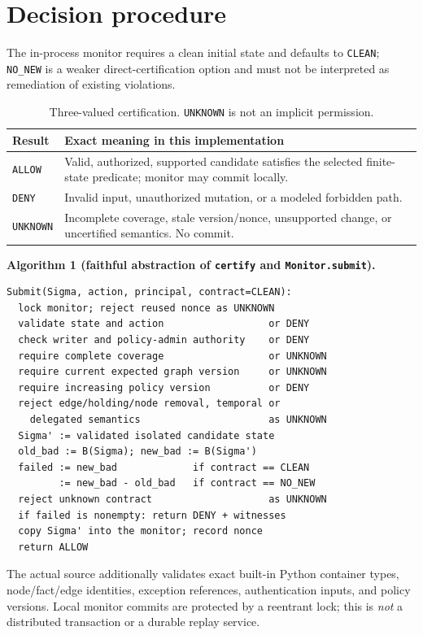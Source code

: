 \documentclass[11pt,letterpaper]{article}
\begin{document}
\section{Decision procedure}
The in-process monitor requires a clean initial state and defaults to \texttt{CLEAN}; \texttt{NO\_NEW} is a weaker direct-certification option and must not be interpreted as remediation of existing violations.
\begin{table}[H]
\centering\small
\begin{tabularx}{\linewidth}{@{}lX@{}}\toprule
Result & Exact meaning in this implementation\\\midrule
\texttt{ALLOW} & Valid, authorized, supported candidate satisfies the selected finite-state predicate; monitor may commit locally.\\
\texttt{DENY} & Invalid input, unauthorized mutation, or a modeled forbidden path.\\
\texttt{UNKNOWN} & Incomplete coverage, stale version/nonce, unsupported change, or uncertified semantics. No commit.\\\bottomrule
\end{tabularx}
\caption{Three-valued certification. \texttt{UNKNOWN} is not an implicit permission.}
\end{table}
\noindent\textbf{Algorithm 1 (faithful abstraction of \texttt{certify} and \texttt{Monitor.submit}).}
\begin{lstlisting}[language={},basicstyle=\ttfamily\small]
Submit(Sigma, action, principal, contract=CLEAN):
  lock monitor; reject reused nonce as UNKNOWN
  validate state and action                  or DENY
  check writer and policy-admin authority    or DENY
  require complete coverage                  or UNKNOWN
  require current expected graph version     or UNKNOWN
  require increasing policy version          or DENY
  reject edge/holding/node removal, temporal or
    delegated semantics                      as UNKNOWN
  Sigma' := validated isolated candidate state
  old_bad := B(Sigma); new_bad := B(Sigma')
  failed := new_bad             if contract == CLEAN
         := new_bad - old_bad   if contract == NO_NEW
  reject unknown contract                    as UNKNOWN
  if failed is nonempty: return DENY + witnesses
  copy Sigma' into the monitor; record nonce
  return ALLOW
\end{lstlisting}
\noindent The actual source additionally validates exact built-in Python container types, node/fact/edge identities, exception references, authentication inputs, and policy versions. Local monitor commits are protected by a reentrant lock; this is \emph{not} a distributed transaction or a durable replay service.
\end{document}
